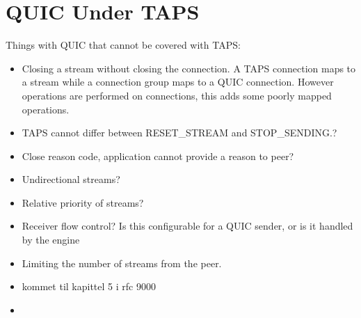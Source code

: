 \section{QUIC Under TAPS}
Things with QUIC that cannot be covered with TAPS:
\begin{itemize}
    \item Closing a stream without closing the connection. A TAPS connection maps to a stream while a connection group maps to a QUIC connection. However operations are performed on connections, this adds some poorly mapped operations.
    \item TAPS cannot differ between RESET\_STREAM and STOP\_SENDING.?
    \item Close reason code, application cannot provide a reason to peer?
    \item Undirectional streams?
    \item Relative priority of streams?
    \item Receiver flow control? Is this configurable for a QUIC sender, or is it handled by the engine
    \item Limiting the number of streams from the peer.
    \item kommet til kapittel 5 i rfc 9000
\item {}
\end{itemize}
